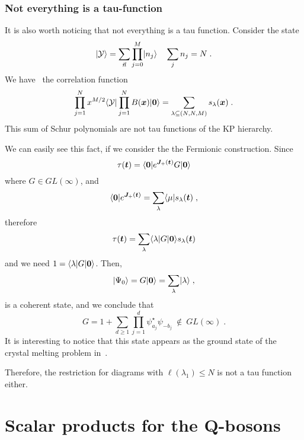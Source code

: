 \documentclass[a4paper,11pt]{amsart}
\begin{document}
\subsubsection{Not everything is a tau-function}
It is also worth noticing that not everything is a tau function. Consider the state
\begin{equation}
  \lvert\mathcal{Y}\rangle =
 \sum_{\vec{n}} \prod_{j=0}^M \lvert n_j\rangle\quad \sum_j n_j = N\; .
\end{equation}
We have~\cite{Bogoliubov2005} the correlation function 
\begin{equation}
  \prod_{j=1}^N x^{M/2} \langle\mathcal{Y}\rvert \prod_{j=1}^N B(\bm{x}) \lvert\bm{0}\rangle = 
  \sum_{\lambda\subseteq (N,N,M)} s_\lambda(\bm{x})\; . 
\end{equation}
This sum of Schur polynomials are not tau functions of the KP hierarchy.

We can easily see this fact, if we consider the the Fermionic
construction. Since
\begin{equation}
\tau(\bm{t}) = \langle\bm{0}\rvert e^{\bm{J}_+(\bm{t})} G \lvert\bm{0}\rangle
\end{equation}
where \(G\in GL(\infty)\), and 
\begin{equation}
  \langle\bm{0}\rvert e^{\bm{J}_+(\bm{t})} = \sum_\lambda \langle\mu\rvert s_\lambda(\bm{t})\; , 
\end{equation}
therefore
\begin{equation}
\tau(\bm{t}) = \sum_{\lambda} \langle\lambda\rvert G \lvert\bm{0}\rangle s_\lambda(\bm{t})
\end{equation}
and we need \(1 = \langle\lambda\rvert G \lvert\bm{0}\rangle \). Then, 
\begin{equation}
  \lvert\Psi_0\rangle = G\lvert\bm{0}\rangle = \sum_\lambda \lvert\lambda\rangle\; ,
\end{equation}
is a coherent state, and we conclude that
\begin{equation}
G = 1 +  \sum_{d\geq 1} \prod_{j=1}^d \psi^\star_{a_j} \psi_{-b_j}\ \notin \ GL(\infty) \;. 
\end{equation}
It is interesting to notice that this state appears as the ground
state of the crystal melting problem in~\cite{Dijkgraaf:2008ua}.

Therefore, the restriction for diagrams with \(\ell(\lambda_1) \leq N\) is
not a tau function either.


\section{Scalar products for the Q-bosons}
\end{document}
